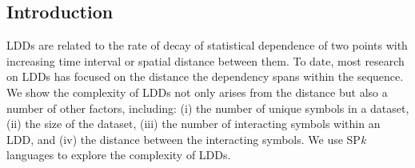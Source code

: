 \documentclass[a0,portrait]{a0poster}
\begin{document}
\begin{multicols}{2}


\color{tudLogoColor}





\color{tudLogoColor}

\section*{Introduction}

\color{black}
LDDs are related to the rate of decay of statistical dependence of two points with increasing time interval or spatial distance between them. To date, most research on LDDs has focused on the distance the dependency spans within the sequence. We show the complexity of LDDs not only arises from the distance but also a number of other factors, including: (i) the number of unique symbols in a dataset, (ii) the size of the dataset, (iii) the number of interacting symbols within an LDD, and (iv) the distance between the interacting symbols. We use SP\emph{k} languages to explore the complexity of LDDs.


\end{multicols}
\end{document}
